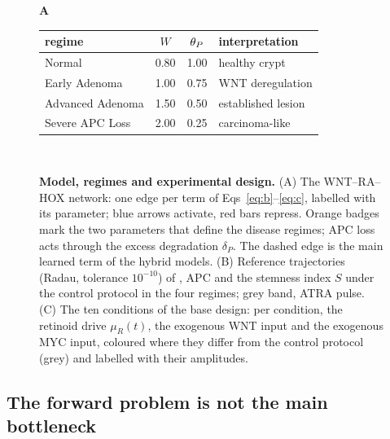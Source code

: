 \begin{figure}[tbp]
\centering
\begin{minipage}[c]{0.58\linewidth}
{\sffamily\bfseries\large A}\\[-0.5ex]
\centering
{}
\end{minipage}\hfill
\begin{minipage}[c]{0.39\linewidth}
\centering\footnotesize\setlength{\tabcolsep}{3pt}
\label{tab:regimes}
\begin{tabular}{lccl}
\toprule
regime & $W$ & $\theta_P$ & interpretation \\
\midrule
Normal & 0.80 & 1.00 & healthy crypt \\
Early Adenoma & 1.00 & 0.75 & WNT deregulation \\
Advanced Adenoma & 1.50 & 0.50 & established lesion \\
Severe APC Loss & 2.00 & 0.25 & carcinoma-like \\
\bottomrule
\end{tabular}
\end{minipage}\\[1.5ex]
\caption{\textbf{Model, regimes and experimental design.} (A) The WNT--RA--HOX
network: one edge per term of Eqs~\eqref{eq:b}--\eqref{eq:c}, labelled with its
parameter; blue arrows activate, red bars repress. Orange badges mark the two
parameters that define the disease regimes; APC loss acts through the excess
degradation $\delta_P$. The dashed edge is the main learned term of the hybrid
models. (B) Reference trajectories (Radau, tolerance $10^{-10}$) of \bcat{}, APC
and the stemness index $S$ under the control protocol in the four regimes; grey
band, ATRA pulse. (C) The ten conditions of the base design: per condition, the
retinoid drive $\mu_R(t)$, the exogenous WNT input and the exogenous MYC input,
coloured where they differ from the control protocol (grey) and labelled with
their amplitudes.}
\label{fig:design}
\end{figure}

\subsection{The forward problem is not the main bottleneck}
\label{sec:res-forward}

